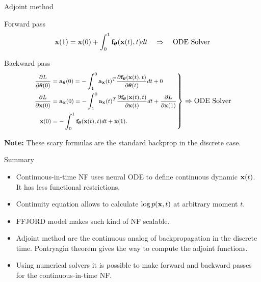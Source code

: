 \begin{frame}{Adjoint method}
	\begin{block}{Forward pass}
		\vspace{-0.3cm}
		\[
		\mathbf{x}(1) = \mathbf{x}(0) + \int^{1}_{0} \mathbf{f}_{\boldsymbol{\theta}}(\mathbf{x}(t), t) d t \quad \Rightarrow \quad \text{ODE Solver}
		\]
		\vspace{-0.4cm}
	\end{block}
	\begin{block}{Backward pass}
		\vspace{-0.5cm}
		\begin{equation*}
			\left.
			{\footnotesize 
				\begin{aligned}
					\frac{\partial L}{\partial \boldsymbol{\theta}(0)} &= \mathbf{a}_{\boldsymbol{\theta}}(0) =  - \int_{1}^{0} \mathbf{a}_{\mathbf{x}}(t)^T \frac{\partial \mathbf{f}_{\boldsymbol{\theta}}(\mathbf{x}(t), t)}{\partial \boldsymbol{\theta}(t)} dt + 0 \\
					\frac{\partial L}{\partial \mathbf{x}(0)} &= \mathbf{a}_{\mathbf{x}}(0) =  - \int_{1}^{0} \mathbf{a}_{\mathbf{x}}(t)^T \frac{\partial \mathbf{f}_{\boldsymbol{\theta}}(\mathbf{x}(t), t)}{\partial \mathbf{x}(t)} dt + \frac{\partial L}{\partial \mathbf{x}(1)} \\
					\mathbf{x}(0) &= - \int^{1}_{0} \mathbf{f}_{\boldsymbol{\theta}}(\mathbf{x}(t), t) d t  + \mathbf{x}(1).
				\end{aligned}
			}
			\right\rbrace
			\Rightarrow
			\text{ODE Solver}
		\end{equation*}
		\vspace{-0.4cm} 
	\end{block}
	\textbf{Note:} These scary formulas are the standard backprop in the discrete case.
\end{frame}
\begin{frame}{Summary}
	\begin{itemize}
		\item Continuous-in-time NF uses neural ODE to define continuous dynamic $\mathbf{x}(t)$. It has less functional restrictions.
		\vfill 
		\item Continuity equation allows to calculate $\log p(\mathbf{x}, t)$ at arbitrary moment $t$.
		\vfill
		\item FFJORD model makes such kind of NF scalable.
		\vfill 
		\item Adjoint method are the continuous analog of backpropagation in the discrete time. Pontryagin theorem gives the way to compute the adjoint functions.
		\vfill
		\item Using numerical solvers it is possible to make forward and backward passes for the continuous-in-time NF.
	\end{itemize}
\end{frame}
 
